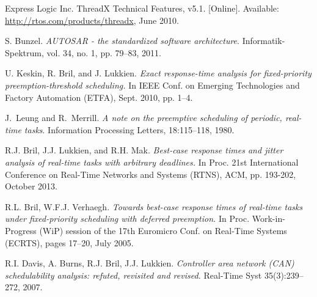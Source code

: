 \documentclass[conference,compsoc]{IEEEtran}
\begin{document}

%
%
%
\begin{thebibliography}{1}

Express Logic Inc. ThreadX Technical Features, v5.1. [Online].
Available: \url{http://rtos.com/products/threadx}, June 2010.

S. Bunzel.
\textit{AUTOSAR - the standardized software architecture}.
Informatik-Spektrum, vol. 34, no. 1, pp. 79–83, 2011.
	
U. Keskin, R. Bril, and J. Lukkien.
\textit{Exact response-time analysis for fixed-priority preemption-threshold scheduling.} 
In IEEE Conf. on
Emerging Technologies and Factory Automation (ETFA), Sept. 2010, pp. 1–4.

J.~Leung and R.~Merrill. \textit{A note on the preemptive scheduling
of periodic, real-time tasks}. 
Information Processing Letters,
18:115–118, 1980.

R.J. Bril, J.J. Lukkien, and R.H. Mak.
\textit{Best-case response times and jitter analysis of real-time tasks with arbitrary deadlines.}
In Proc. 21st International Conference on Real-Time Networks and Systems (RTNS), ACM, pp. 193-202, October 2013.

R.L. Bril, W.F.J. Verhaegh.
\textit{Towards best-case response times of real-time tasks under fixed-priority scheduling with deferred preemption.}
In Proc. Work-in-Progress (WiP) session of the 17th Euromicro Conf. on Real-Time Systems (ECRTS), pages 17–20, July 2005.

R.I. Davis, A. Burns, R.J. Bril, J.J. Lukkien.
\textit{Controller area network (CAN) schedulability analysis: refuted, revisited and revised.}
Real-Time Syst 35(3):239–272, 2007.


\end{thebibliography}




\end{document}
